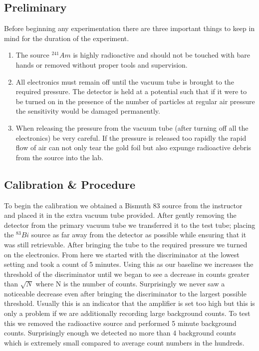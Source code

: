 \subsection{Preliminary}
\indent \indent  Before beginning any experimentation there are three important things to keep in mind for the duration of the experiment. 
\begin{enumerate}
\item The source $^{241} Am$ is highly radioactive and should not be touched with bare hands or removed without proper tools and supervision. 
\item All electronics must remain off until the vacuum tube is brought to the required pressure.  The detector is held at a potential such that if it were to be turned on in the presence of the number of particles at regular air pressure the sensitivity would be damaged permanently.
\item When releasing the pressure from the vacuum tube (after turning off all the electronics) be very careful.  If the pressure is released too rapidly the rapid flow of air can not only tear the gold foil but also expunge radioactive debris from the source into the lab. 
\end{enumerate}

\subsection{Calibration \& Procedure}
\indent \indent  To begin the calibration we obtained a Bismuth 83 source from the instructor and placed it in the extra vacuum tube provided. After gently removing the detector from the primary vacuum tube we transferred it to the test tube;  placing the $^{83}Bi$ source as far away from the detector as possible while ensuring that it was still retrievable. After bringing the tube to the required pressure we turned on the electronics.  From here we started with the discriminator at the lowest setting and took a count of 5 minutes.  Using this as our baseline we increases the threshold of the discriminator until we began to see a decrease in counts greater than $\sqrt{N}$ where N is the number of counts.  Surprisingly we never saw a noticeable decrease even after bringing the discriminator to the largest possible threshold.  Usually this is an indicator that the amplifier is set too high but this is only a problem if we are additionally recording large background counts.  To test this we removed the radioactive source and performed 5 minute background counts.  Surprisingly enough we detected no more than 4 background counts which is extremely small compared to average count numbers in the hundreds.  

